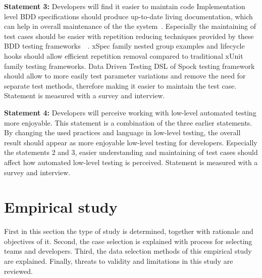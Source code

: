     \begin{addmargin}[0em]{0em}
    \vspace{10px}
    \textbf{Statement 3:} Developers will find it easier to maintain code
    \vspace{5px}
    \newline
    Implementation level BDD specifications should produce up-to-date living documentation, which can help in overall
    maintenance of the the system~\cite{smart2014bdd}. Especially the maintaining of test cases should be easier
    with repetition reducing techniques provided by these BDD testing frameworks~\cite{chelimsky2010rspec}~\cite{kapelonis2016java}.
    xSpec family nested group examples and lifecycle hooks should allow efficient repetition removal compared to traditional xUnit family testing frameworks.
    Data Driven Testing DSL of Spock testing framework should allow to more easily test parameter variations and remove
    the need for separate test methods, therefore making it easier to maintain the test case.
    Statement is measured with a survey and interview.
    \end{addmargin}

    \begin{addmargin}[0em]{0em}
    \vspace{10px}
    \textbf{Statement 4:} Developers will perceive working with low-level automated testing more enjoyable.
    \vspace{5px}
    \newline
    This statement is a combination of the three earlier statements. By changing the used practices and language in low-level testing,
    the overall result should appear as more enjoyable low-level testing for developers. Especially the statements 2 and 3, easier understanding
    and maintaining of test cases should affect how automated low-level testing is perceived.
    Statement is measured with a survey and interview.
    \end{addmargin}

\section{Empirical study}
First in this section the type of study is determined, together with rationale and objectives of it. Second, the case selection
is explained with process for selecting teams and developers. Third, the data selection methods of this empirical study are
explained. Finally, threats to validity and limitations in this study are reviewed.

